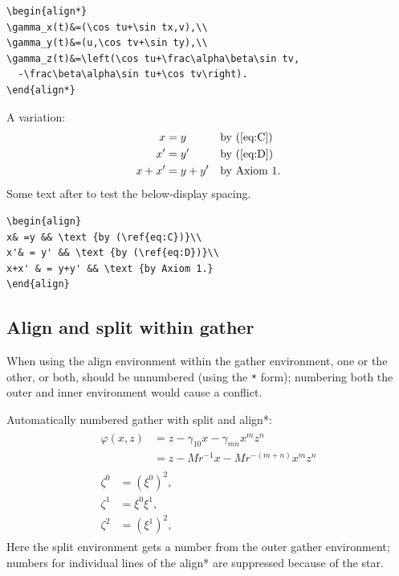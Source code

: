 \documentclass{article}
\newcommand{\ntt}{\normalfont\ttfamily}
\newcommand{\env}[1]{{\protect\ntt#1}}
\theoremstyle{definition}
\theoremstyle{remark}
\begin{document}
\begin{verbatim}
\begin{align*}
\gamma_x(t)&=(\cos tu+\sin tx,v),\\
\gamma_y(t)&=(u,\cos tv+\sin ty),\\
\gamma_z(t)&=\left(\cos tu+\frac\alpha\beta\sin tv,
  -\frac\beta\alpha\sin tu+\cos tv\right).
\end{align*}
\end{verbatim}

A variation:
\begin{align}
x& =y && \text {by (\ref{eq:C})}\\
x'& = y' && \text {by (\ref{eq:D})}\\
x+x' & = y+y' && \text {by Axiom 1.}
\end{align}
Some text after to test the below-display spacing.

\begin{verbatim}
\begin{align}
x& =y && \text {by (\ref{eq:C})}\\
x'& = y' && \text {by (\ref{eq:D})}\\
x+x' & = y+y' && \text {by Axiom 1.}
\end{align}
\end{verbatim}

\newpage
\subsection{Align and split within gather}
When using the \env{align} environment within the \env{gather}
environment, one or the other, or both, should be unnumbered (using the
\verb"*" form); numbering both the outer and inner environment would
cause a conflict.

Automatically numbered \env{gather} with \env{split} and \env{align*}:
\begin{gather}
\begin{split} \varphi(x,z)
&=z-\gamma_{10}x-\gamma_{mn}x^mz^n\\
&=z-Mr^{-1}x-Mr^{-(m+n)}x^mz^n
\end{split}\\[6pt]
\begin{align*}
\zeta^0 &=(\xi^0)^2,\\
\zeta^1 &=\xi^0\xi^1,\\
\zeta^2 &=(\xi^1)^2,
\end{align*}
\end{gather}
Here the \env{split} environment gets a number from the outer
\env{gather} environment; numbers for individual lines of the
\env{align*} are suppressed because of the star.
\end{document}
